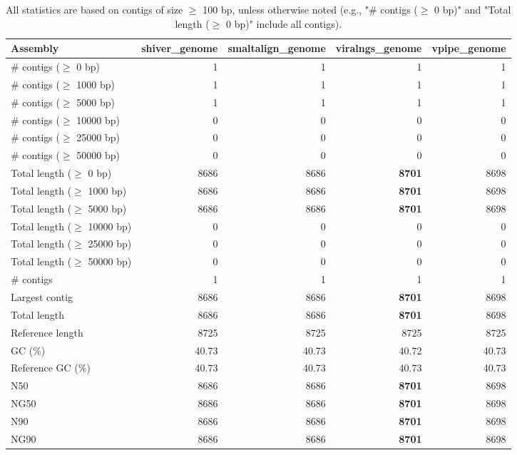 \documentclass[12pt,a4paper]{article}
\begin{document}
\begin{table}[ht]
\begin{center}
\caption{All statistics are based on contigs of size $\geq$ 100 bp, unless otherwise noted (e.g., "\# contigs ($\geq$ 0 bp)" and "Total length ($\geq$ 0 bp)" include all contigs).}
\begin{tabular}{|l*{4}{|r}|}
\hline
Assembly & shiver\_genome & smaltalign\_genome & viralngs\_genome & vpipe\_genome \\ \hline
\# contigs ($\geq$ 0 bp) & 1 & 1 & 1 & 1 \\ \hline
\# contigs ($\geq$ 1000 bp) & 1 & 1 & 1 & 1 \\ \hline
\# contigs ($\geq$ 5000 bp) & 1 & 1 & 1 & 1 \\ \hline
\# contigs ($\geq$ 10000 bp) & 0 & 0 & 0 & 0 \\ \hline
\# contigs ($\geq$ 25000 bp) & 0 & 0 & 0 & 0 \\ \hline
\# contigs ($\geq$ 50000 bp) & 0 & 0 & 0 & 0 \\ \hline
Total length ($\geq$ 0 bp) & 8686 & 8686 & {\bf 8701} & 8698 \\ \hline
Total length ($\geq$ 1000 bp) & 8686 & 8686 & {\bf 8701} & 8698 \\ \hline
Total length ($\geq$ 5000 bp) & 8686 & 8686 & {\bf 8701} & 8698 \\ \hline
Total length ($\geq$ 10000 bp) & 0 & 0 & 0 & 0 \\ \hline
Total length ($\geq$ 25000 bp) & 0 & 0 & 0 & 0 \\ \hline
Total length ($\geq$ 50000 bp) & 0 & 0 & 0 & 0 \\ \hline
\# contigs & 1 & 1 & 1 & 1 \\ \hline
Largest contig & 8686 & 8686 & {\bf 8701} & 8698 \\ \hline
Total length & 8686 & 8686 & {\bf 8701} & 8698 \\ \hline
Reference length & 8725 & 8725 & 8725 & 8725 \\ \hline
GC (\%) & 40.73 & 40.73 & 40.72 & 40.73 \\ \hline
Reference GC (\%) & 40.73 & 40.73 & 40.73 & 40.73 \\ \hline
N50 & 8686 & 8686 & {\bf 8701} & 8698 \\ \hline
NG50 & 8686 & 8686 & {\bf 8701} & 8698 \\ \hline
N90 & 8686 & 8686 & {\bf 8701} & 8698 \\ \hline
NG90 & 8686 & 8686 & {\bf 8701} & 8698 \\ \hline

\end{tabular}
\end{center}
\end{table}
\end{document}

